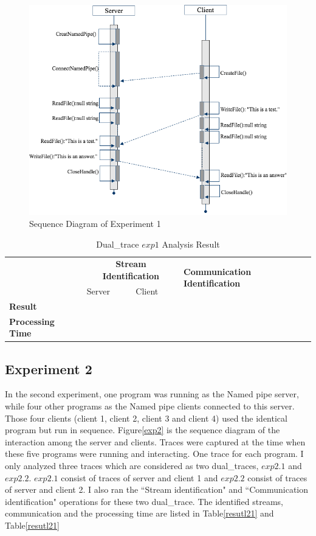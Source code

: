 \begin{figure}[H]
\centerline{\includegraphics[scale=0.7]{Figures/exp1}}
 \caption{Sequence Diagram of Experiment 1}
\label{exp1}
\end{figure}

    \begin{table}[H]
        \centering
        \caption{Dual\_trace  $exp1$  Analysis Result}
        \label{result1}
        \begin{tabular}{|l|l|l|l|}
            \hline
             \multirow{2}{*}{\textbf{}} &
               \multicolumn{2}{c|}{\textbf{Stream Identification}} &
                \multirow{2}{*}{\textbf{Communication Identification}}\\
             \cline{2-3}
              &Server &Client &   \\
              \hline
              \textbf{Result} & & &   \\
             \hline
               \textbf{Processing Time}& \multicolumn{2}{c|}{}&  \\
              \hline
        \end{tabular}
    \end{table}

\subsection{Experiment 2}
In the second experiment, one program was running as the Named pipe server, while four other programs as the Named pipe clients connected to this server. Those four clients (client 1, client 2, client 3 and client 4) used the identical program but run in sequence. Figure\ref{exp2} is the sequence diagram of  the interaction among the server and clients. Traces were captured at the time when these five programs were running and interacting. One trace for each program. I only analyzed  three traces which are considered as two dual\_traces, $exp2.1$ and $exp2.2$. $exp2.1$ consist of traces of server and client 1 and $exp2.2$ consist of traces of server and client 2. I also ran the ``Stream identification" and ``Communication identification" operations for these two dual\_trace. The identified streams, communication and the processing time are listed in Table\ref{resutl21} and Table\ref{resutl21}


